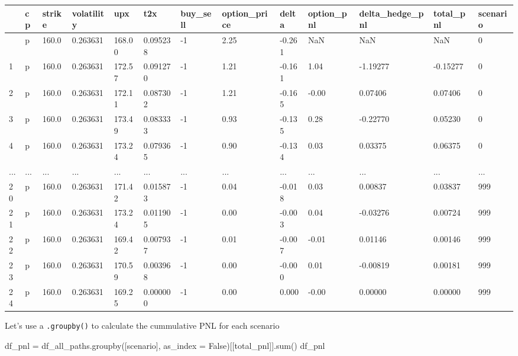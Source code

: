 \documentclass[
  letterpaper,
  DIV=11,
  numbers=noendperiod]{scrreprt}
\newenvironment{Shaded}{\begin{snugshade}}{\end{snugshade}}
\newcommand{\BuiltInTok}[1]{\textcolor[rgb]{0.00,0.23,0.31}{#1}}
\newcommand{\NormalTok}[1]{\textcolor[rgb]{0.00,0.23,0.31}{#1}}
\newcommand{\OperatorTok}[1]{\textcolor[rgb]{0.37,0.37,0.37}{#1}}
\newcommand{\StringTok}[1]{\textcolor[rgb]{0.13,0.47,0.30}{#1}}
\newcommand{\VariableTok}[1]{\textcolor[rgb]{0.07,0.07,0.07}{#1}}
\begin{document}
\begin{longtable}[]{@{}lllllllllllll@{}}
\toprule\noalign{}
& cp & strike & volatility & upx & t2x & buy\_sell & option\_price &
delta & option\_pnl & delta\_hedge\_pnl & total\_pnl & scenario \\
\midrule\noalign{}
\endhead
\bottomrule\noalign{}
\endlastfoot
0 & p & 160.0 & 0.263631 & 168.00 & 0.095238 & -1 & 2.25 & -0.261 & NaN
& NaN & NaN & 0 \\
1 & p & 160.0 & 0.263631 & 172.57 & 0.091270 & -1 & 1.21 & -0.161 & 1.04
& -1.19277 & -0.15277 & 0 \\
2 & p & 160.0 & 0.263631 & 172.11 & 0.087302 & -1 & 1.21 & -0.165 &
-0.00 & 0.07406 & 0.07406 & 0 \\
3 & p & 160.0 & 0.263631 & 173.49 & 0.083333 & -1 & 0.93 & -0.135 & 0.28
& -0.22770 & 0.05230 & 0 \\
4 & p & 160.0 & 0.263631 & 173.24 & 0.079365 & -1 & 0.90 & -0.134 & 0.03
& 0.03375 & 0.06375 & 0 \\
... & ... & ... & ... & ... & ... & ... & ... & ... & ... & ... & ... &
... \\
20 & p & 160.0 & 0.263631 & 171.42 & 0.015873 & -1 & 0.04 & -0.018 &
0.03 & 0.00837 & 0.03837 & 999 \\
21 & p & 160.0 & 0.263631 & 173.24 & 0.011905 & -1 & 0.00 & -0.003 &
0.04 & -0.03276 & 0.00724 & 999 \\
22 & p & 160.0 & 0.263631 & 169.42 & 0.007937 & -1 & 0.01 & -0.007 &
-0.01 & 0.01146 & 0.00146 & 999 \\
23 & p & 160.0 & 0.263631 & 170.59 & 0.003968 & -1 & 0.00 & -0.000 &
0.01 & -0.00819 & 0.00181 & 999 \\
24 & p & 160.0 & 0.263631 & 169.25 & 0.000000 & -1 & 0.00 & 0.000 &
-0.00 & 0.00000 & 0.00000 & 999 \\
\end{longtable}

Let's use a \texttt{.groupby()} to calculate the cummulative PNL for
each scenario

\begin{Shaded}
\begin{Highlighting}[]
\NormalTok{df\_pnl }\OperatorTok{=}\NormalTok{ df\_all\_paths.groupby([}\StringTok{\textquotesingle{}scenario\textquotesingle{}}\NormalTok{], as\_index }\OperatorTok{=} \VariableTok{False}\NormalTok{)[[}\StringTok{\textquotesingle{}total\_pnl\textquotesingle{}}\NormalTok{]].}\BuiltInTok{sum}\NormalTok{()}
\NormalTok{df\_pnl}
\end{Highlighting}
\end{Shaded}
\end{document}

